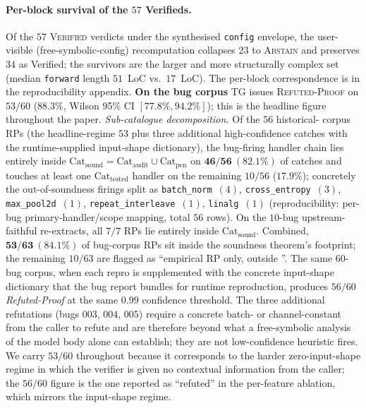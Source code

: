 \paragraph{Per-block survival of the $57$ Verifieds.}
Of the $57$ \textsc{Verified} verdicts under the synthesised
\texttt{config} envelope, the user-visible
(free-symbolic-config) recomputation collapses $23$ to
\textsc{Abstain} and preserves $34$ as Verified; the survivors
are the larger and more structurally complex set (median
\texttt{forward} length $51$~LoC vs.\ $17$~LoC). The per-block
correspondence is in the reproducibility appendix.
\textbf{On the bug corpus} \textsc{TG} issues
\textsc{Refuted-Proof} on $53/60$ ($88.3\%$, Wilson 95\% CI
$[77.8\%, 94.2\%]$); this is the headline figure throughout the
paper. \emph{Sub-catalogue decomposition.} Of the $56$ historical-
corpus RPs (the headline-regime $53$ plus three additional
high-confidence catches with the runtime-supplied input-shape
dictionary), the bug-firing handler chain lies entirely inside
$\mathrm{Cat}_{\mathrm{sound}}=\mathrm{Cat}_{\mathrm{audit}}\cup
\mathrm{Cat}_{\mathrm{pen}}$ on $\mathbf{46/56\ (82.1\%)}$ of
catches and touches at least one $\mathrm{Cat}_{\mathrm{tested}}$
handler on the remaining $10/56$ ($17.9\%$); concretely the
out-of-soundness firings split as \texttt{batch\_norm}~$(4)$,
\texttt{cross\_entropy}~$(3)$, \texttt{max\_pool2d}~$(1)$,
\texttt{repeat\_interleave}~$(1)$, \texttt{linalg}~$(1)$
(reproducibility: per-bug primary-handler/scope mapping, total
$56$ rows). On the $10$-bug upstream-faithful re-extracts,
all $7/7$ RPs lie entirely inside $\mathrm{Cat}_{\mathrm{sound}}$.
Combined, $\mathbf{53/63\ (84.1\%)}$ of bug-corpus RPs sit
inside the soundness theorem's footprint; the remaining
$10/63$ are flagged as ``empirical RP only, outside
''. The same $60$-bug corpus, when each repro is supplemented
with the concrete input-shape dictionary that the bug
report bundles for runtime reproduction, produces
\emph{$56/60$ Refuted-Proof} at the same $0.99$ confidence
threshold. The three additional refutations (bugs $003$, $004$,
$005$) require a concrete batch- or channel-constant from the
caller to refute and are therefore beyond what a free-symbolic
analysis of the model body alone can establish; they are not
low-confidence heuristic fires. We carry $53/60$ throughout because
it corresponds to the harder zero-input-shape regime in which the
verifier is given no contextual information from the caller; the
$56/60$ figure is the one reported as ``refuted'' in the
per-feature ablation, which mirrors the input-shape regime.
